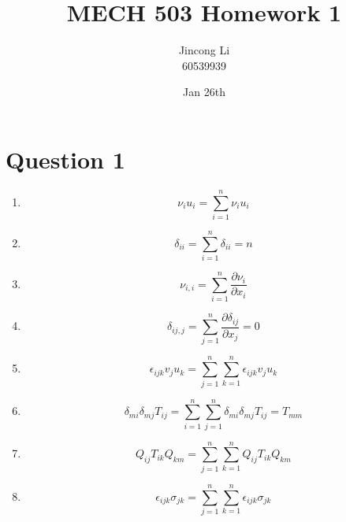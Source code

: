 \documentclass[a4paper,12pt]{article} %
\begin{document}
\newcommand{\vect}[1]{\mathbf{#1}}

\title{MECH 503 Homework 1}
\author{Jincong Li \\ 60539939}
\date{Jan 26th}
\maketitle

\section{\textbf{Question 1}}

\begin{enumerate}[label= (\alph*)]
    \item \[ \nu_i u_i = \sum_{i=1}^{n} \nu_i u_i \]

    \item \[ \delta_{ii} = \sum_{i=1}^{n} \delta_{ii} = n \]

    \item \[ \nu_{i,i} = \sum_{i=1}^{n} \frac{\partial \nu_i}{\partial x_i} \]

    \item \[ \delta_{ij,j} = \sum_{j=1}^{n} \frac{\partial \delta_{ij}}{\partial x_j} = 0 \]

    \item \[ \epsilon_{ijk} v_j u_k = \sum_{j=1}^{n} \sum_{k=1}^{n} \epsilon_{ijk} v_j u_k \]

    \item \[ \delta_{mi} \delta_{mj} T_{ij} = \sum_{i=1}^{n} \sum_{j=1}^{n} \delta_{mi} \delta_{mj} T_{ij} = T_{mm} \]

    \item \[ Q_{ij} T_{ik} Q_{km} = \sum_{j=1}^{n} \sum_{k=1}^{n} Q_{ij} T_{ik} Q_{km} \]

    \item \[ \epsilon_{ijk} \sigma_{jk} = \sum_{j=1}^{n} \sum_{k=1}^{n} \epsilon_{ijk} \sigma_{jk} \]
\end{enumerate}
\end{document}
